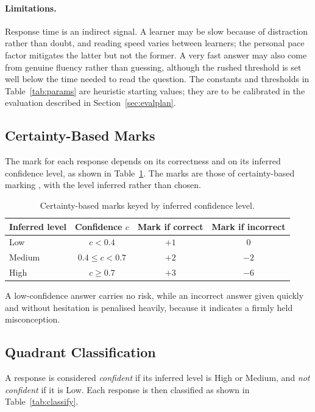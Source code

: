 \documentclass[12pt,a4paper,oneside]{report}
\begin{document}
\paragraph{Limitations.} Response time is an indirect signal. A learner may
be slow because of distraction rather than doubt, and reading speed varies
between learners; the personal pace factor mitigates the latter but not
the former. A very fast answer may also come from genuine fluency rather
than guessing, although the rushed threshold is set well below the time
needed to read the question. The constants and thresholds in
Table~\ref{tab:params} are heuristic starting values; they are to be
calibrated in the evaluation described in Section~\ref{sec:evalplan}.

\subsection{Certainty-Based Marks}

The mark for each response depends on its correctness and on its inferred
confidence level, as shown in Table~\ref{tab:cbm}. The marks are those of
certainty-based marking \cite{gardnermedwin2003}, with the level inferred
rather than chosen.

\begin{table}[H]
\centering
\caption{Certainty-based marks keyed by inferred confidence level.}
\label{tab:cbm}
\begin{tabular}{@{}lccc@{}}
\toprule
\textbf{Inferred level} & \textbf{Confidence $c$} & \textbf{Mark if correct} & \textbf{Mark if incorrect} \\
\midrule
Low    & $c < 0.4$          & $+1$ & $0$ \\
Medium & $0.4 \le c < 0.7$ & $+2$ & $-2$ \\
High   & $c \ge 0.7$        & $+3$ & $-6$ \\
\bottomrule
\end{tabular}
\end{table}

A low-confidence answer carries no risk, while an incorrect answer given
quickly and without hesitation is penalised heavily, because it indicates
a firmly held misconception.

\subsection{Quadrant Classification}

A response is considered \emph{confident} if its inferred level is High or
Medium, and \emph{not confident} if it is Low. Each response is then
classified as shown in Table~\ref{tab:classify}.
\end{document}
